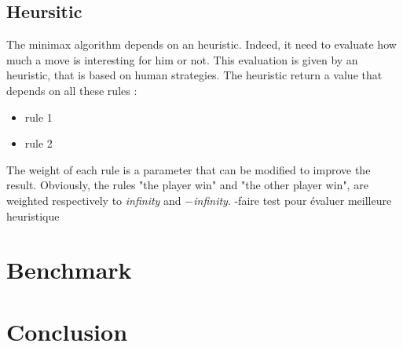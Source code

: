 \documentclass{article}
\begin{document}
\subsection{Heursitic}
The minimax algorithm depends on an heuristic. Indeed, it need to evaluate how much a move is interesting for him %
or not. This evaluation is given by an heuristic, that is based on human strategies.
The heuristic return a value that depends on all these rules :
\begin{itemize}
    \item rule 1
    \item rule 2
\end{itemize}
The weight of each rule is a parameter that can be modified to improve the result. Obviously, the rules "the player win" and "the other player win", are weighted respectively
to \textit{infinity} and $-$\textit{infinity}.
 -faire test pour évaluer meilleure heuristique


\section{Benchmark} \label{sec:benchmark}

\section{Conclusion}
\end{document}

